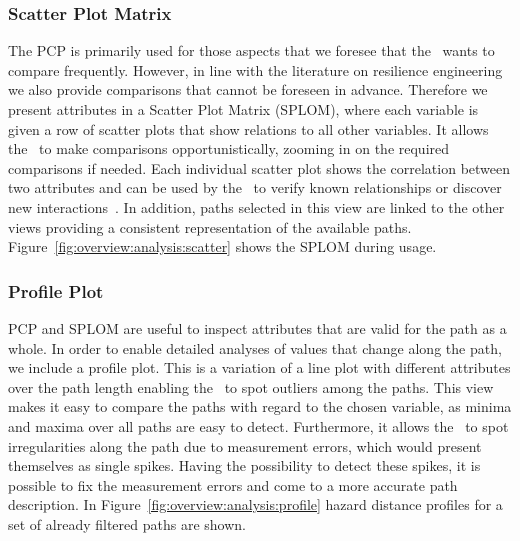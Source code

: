 \subsubsection{Scatter Plot Matrix} \label{sec:overview:analysis:scatter}
The PCP is primarily used for those aspects that we foresee that the \IC\ wants to compare frequently. However, in line with the literature on resilience engineering~\cite{Lundberg2012} we also provide comparisons that cannot be foreseen in advance. Therefore we present attributes in a Scatter Plot Matrix (SPLOM), where each variable is given a row of scatter plots that show relations to all other variables. It allows the \IC\ to make comparisons opportunistically, zooming in on the required comparisons if needed. Each individual scatter plot shows the correlation between two attributes and can be used by the \IC\ to verify known relationships or discover new interactions~\cite{Li2008}. In addition, paths selected in this view are linked to the other views providing a consistent representation of the available paths. Figure~\ref{fig:overview:analysis:scatter} shows the SPLOM during usage.

\subsubsection{Profile Plot} \label{sec:overview:analysis:profile}
PCP and SPLOM are useful to inspect attributes that are valid for the path as a whole. In order to enable detailed analyses of values that change along the path, we include a profile plot. This is a variation of a line plot with different attributes over the path length enabling the \IC\ to spot outliers among the paths. This view makes it easy to compare the paths with regard to the chosen variable, as minima and maxima over all paths are easy to detect. Furthermore, it allows the \IC\ to spot irregularities along the path due to measurement errors, which would present themselves as single spikes. Having the possibility to detect these spikes, it is possible to fix the measurement errors and come to a more accurate path description. In Figure~\ref{fig:overview:analysis:profile} hazard distance profiles for a set of already filtered paths are shown. 

